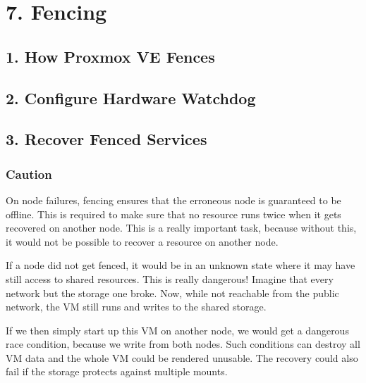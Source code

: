 \begin{table}[htbp]

\centering

\begin{tabular}

\end{tabular}

\end{table}


\section{7. Fencing}

\subsection{1. How Proxmox VE Fences}

\subsection{2. Configure Hardware Watchdog}

\subsection{3. Recover Fenced Services}

\subsubsection{Caution}

On node failures, fencing ensures that the erroneous node is guaranteed to be offline. This is required to make sure that no resource runs twice when it gets recovered on another node. This is a really important task, because without this, it would not be possible to recover a resource on another node.

If a node did not get fenced, it would be in an unknown state where it may have still access to shared resources. This is really dangerous! Imagine that every network but the storage one broke. Now, while not reachable from the public network, the VM still runs and writes to the shared storage.

If we then simply start up this VM on another node, we would get a dangerous race condition, because we write from both nodes. Such conditions can destroy all VM data and the whole VM could be rendered unusable. The recovery could also fail if the storage protects against multiple mounts.

